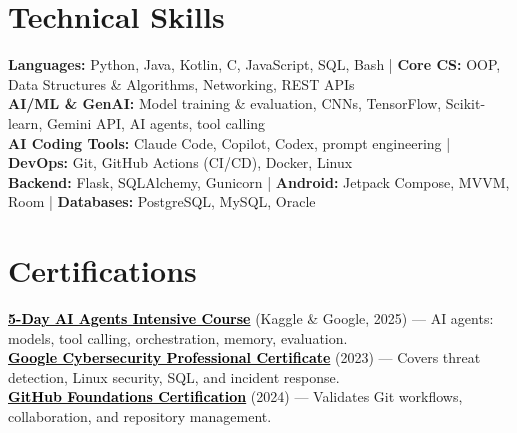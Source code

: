 \documentclass[a4paper]{article}
\begin{document}
\section{Technical Skills}
\begin{itemize}[leftmargin=0.15in, label={}]
\small{\item{
\textbf{Languages:} Python, Java, Kotlin, C, JavaScript, SQL, Bash \;|\;
\textbf{Core CS:} OOP, Data Structures \& Algorithms, Networking, REST APIs\\
\textbf{AI/ML \& GenAI:} Model training \& evaluation, CNNs, TensorFlow, Scikit-learn, Gemini API, AI agents, tool calling\\
\textbf{AI Coding Tools:} Claude Code, Copilot, Codex, prompt engineering \;|\;
\textbf{DevOps:} Git, GitHub Actions (CI/CD), Docker, Linux\\
\textbf{Backend:} Flask, SQLAlchemy, Gunicorn \;|\;
\textbf{Android:} Jetpack Compose, MVVM, Room \;|\;
\textbf{Databases:} PostgreSQL, MySQL, Oracle
}}
\end{itemize}




\section{Certifications}
 \begin{itemize}[leftmargin=0.15in, label={}]
    \small{\item{
    \href{https://www.kaggle.com/certification/badges/badhon495/105}{\textcolor{black}{\textbf{5-Day AI Agents Intensive Course}}} (Kaggle \& Google, 2025) --- AI agents: models, tool calling, orchestration, memory, evaluation. \\
    \href{https://coursera.org/share/44fd8f381cb39ac45892569cdf6f7674}{\textcolor{black}{\textbf{Google Cybersecurity Professional Certificate}}} (2023) --- Covers threat detection, Linux security, SQL, and incident response. \\
    \href{https://www.credly.com/badges/d5c30c19-02db-4c5f-9bc9-4bd0f4b6a89e/public_url}{\textcolor{black}{\textbf{GitHub Foundations Certification}}} (2024) --- Validates Git workflows, collaboration, and repository management.
    }}
 \end{itemize}


\end{document}
